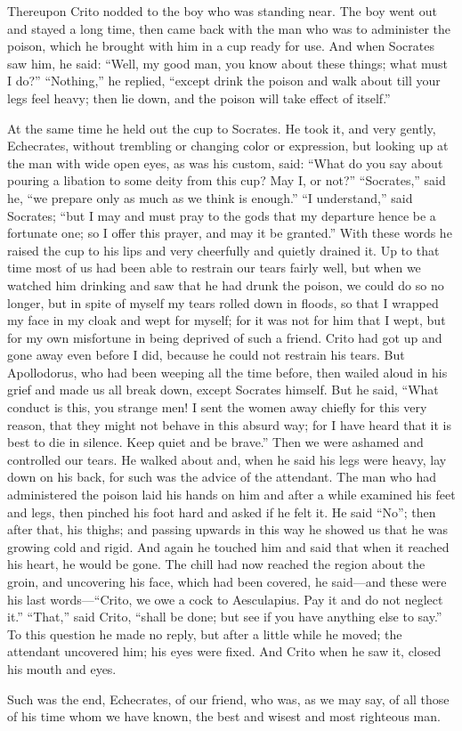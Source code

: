 \documentclass[letterpaper,12pt]{article}
\newcommand{\stephpag}[1]{\marginnote{\small\itshape\fontfamily{ppl}\selectfont #1}}
\begin{document}
\begin{drama}
Thereupon Crito nodded to the boy who was standing near. The boy went out and stayed a long time, then came back with the man who was to administer the poison, which he brought with him in a cup ready for use. And when Socrates saw him, he said: ``Well, my good man, you know about these things; what must I do?'' ``Nothing,'' he replied, ``except drink the poison and walk about \stephpag{b} till your legs feel heavy; then lie down, and the poison will take effect of itself.''
 
At the same time he held out the cup to Socrates. He took it, and very gently, Echecrates, without trembling or changing color or expression, but looking up at the man with wide open eyes, as was his custom, said: ``What do you say about pouring a libation to some deity from this cup? May I, or not?'' ``Socrates,'' said he, ``we prepare only as much as we think is enough.'' ``I understand,'' said Socrates; \stephpag{c} ``but I may and must pray to the gods that my departure hence be a fortunate one; so I offer this prayer, and may it be granted.'' With these words he raised the cup to his lips and very cheerfully and quietly drained it. Up to that time most of us had been able to restrain our tears fairly well, but when we watched him drinking and saw that he had drunk the poison, we could do so no longer, but in spite of myself my tears rolled down in floods, so that I wrapped my face in my cloak and wept for myself; for it was not for him that I wept, \stephpag{d} but for my own misfortune in being deprived of such a friend. Crito had got up and gone away even before I did, because he could not restrain his tears. But Apollodorus, who had been weeping all the time before, then wailed aloud in his grief and made us all break down, except Socrates himself. But he said, ``What conduct is this, you strange men! I sent the women away chiefly for this very reason, that they might not behave in this absurd way; for I have heard that \stephpag{e} it is best to die in silence. Keep quiet and be brave.'' Then we were ashamed and controlled our tears. He walked about and, when he said his legs were heavy, lay down on his back, for such was the advice of the attendant. The man who had administered the poison laid his hands on him and after a while examined his feet and legs, then pinched his foot hard and asked if he felt it. He said ``No''; then after that, \stephpag{118 a} his thighs; and passing upwards in this way he showed us that he was growing cold and rigid. And again he touched him and said that when it reached his heart, he would be gone. The chill had now reached the region about the groin, and uncovering his face, which had been covered, he said---and these were his last words---``Crito, we owe a cock to Aesculapius. Pay it and do not neglect it.'' ``That,'' said Crito, ``shall be done; but see if you have anything else to say.'' To this question he made no reply, but after a little while he moved; the attendant uncovered him; his eyes were fixed. And Crito when he saw it, closed his mouth and eyes.
 
Such was the end, Echecrates, of our friend, who was, as we may say, of all those of his time whom we have known, the best and wisest and most righteous man.

\end{drama}
\end{document}
